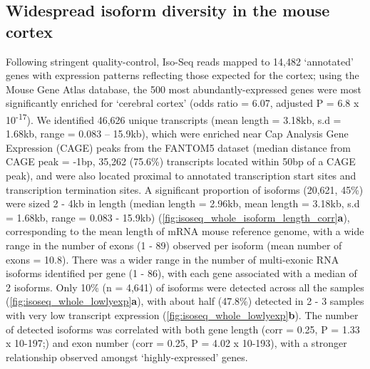 \subsection{Widespread isoform diversity in the mouse cortex}
Following stringent quality-control, Iso-Seq reads mapped to 14,482 ‘annotated’ genes with expression patterns reflecting those expected for the cortex; using the Mouse Gene Atlas database, the 500 most abundantly-expressed genes were most significantly enriched for ‘cerebral cortex’ (odds ratio = 6.07, adjusted P = 6.8 x 10\textsuperscript{-17}). We identified 46,626 unique transcripts (mean length = 3.18kb, s.d = 1.68kb, range = 0.083 – 15.9kb), which were enriched near Cap Analysis Gene Expression (CAGE) peaks from the FANTOM5 dataset (median distance from CAGE peak = -1bp, 35,262 (75.6\%) transcripts located within 50bp of a CAGE peak), and were also located proximal to annotated transcription start sites and transcription termination sites. A significant proportion of isoforms (20,621, 45\%) were sized 2 - 4kb in length (median length = 2.96kb, mean length = 3.18kb, s.d = 1.68kb, range = 0.083 - 15.9kb) (\cref{fig:isoseq_whole_isoform_length_corr}\textbf{a}), corresponding to the mean length of mRNA mouse reference genome, with a wide range in the number of exons (1 - 89) observed per isoform (mean number of exons = 10.8). There was a wider range in the number of multi-exonic RNA isoforms identified per gene (1 - 86), with each gene associated with a median of 2 isoforms. Only 10\% (n = 4,641) of isoforms were detected across all the samples (\cref{fig:isoseq_whole_lowlyexp}\textbf{a}), with about half (47.8\%) detected in 2 - 3 samples with very low transcript expression (\cref{fig:isoseq_whole_lowlyexp}\textbf{b}). The number of detected isoforms was correlated with both gene length (corr = 0.25, P = 1.33 x 10-197;) and exon number (corr = 0.25, P = 4.02 x 10-193), with a stronger relationship observed amongst ‘highly-expressed’ genes.

